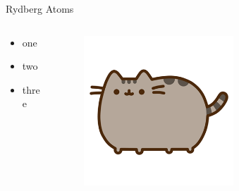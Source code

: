 \begin{frame}{Rydberg Atoms}
    \begin{columns}
        \begin{column}{0.5\textwidth}
            \begin{itemize}
                \item one
                \item two
                \item three
            \end{itemize}
        \end{column}
        \begin{column}{0.5\textwidth}
            \begin{figure}
                \centering
                \includegraphics[width=0.6\textwidth]{images/pusheen.png}
            \end{figure}
        \end{column}
    \end{columns}
\end{frame}

